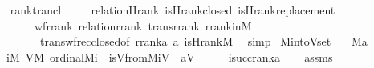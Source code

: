 \begin{isabellebody}
%
\isadelimproof
\ \ %
\endisadelimproof
%
\isatagproof
{}\isamarkupfalse%
\ rank{\isacharunderscore}{\kern0pt}trancl\ \isanewline
\ \ \isamarkupfalse%
\ relation{}{\isacharunderscore}{\kern0pt}Hrank\ is{\isacharunderscore}{\kern0pt}Hrank{\isacharunderscore}{\kern0pt}closed\ is{\isacharunderscore}{\kern0pt}Hrank{\isacharunderscore}{\kern0pt}replacement\ \isanewline
\ \ \ \ \ \ \ \ wf{\isacharunderscore}{\kern0pt}rrank\ relation{\isacharunderscore}{\kern0pt}rrank\ trans{\isacharunderscore}{\kern0pt}rrank\ rrank{\isacharunderscore}{\kern0pt}in{\isacharunderscore}{\kern0pt}M\ \isanewline
\ \ \ \ \ \ \ \ \ trans{\isacharunderscore}{\kern0pt}wfrec{\isacharunderscore}{\kern0pt}closed{\isacharbrackleft}{\kern0pt}of\ {\isachardoublequoteopen}rrank{\isacharparenleft}{\kern0pt}a{\isacharparenright}{\kern0pt}{\isachardoublequoteclose}\ a\ {\isachardoublequoteopen}is{\isacharunderscore}{\kern0pt}Hrank{\isacharparenleft}{\kern0pt}M{\isacharparenright}{\kern0pt}{\isachardoublequoteclose}{\isacharbrackright}{\kern0pt}\ \isamarkupfalse%
\ simp%
\endisatagproof
{\isafoldproof}%
%
\isadelimproof
\isanewline
%
\endisadelimproof
\isanewline
\isanewline
{}\isamarkupfalse%
\ M{\isacharunderscore}{\kern0pt}into{\isacharunderscore}{\kern0pt}Vset{\isacharcolon}{\kern0pt}\isanewline
\ \ \ {\isachardoublequoteopen}M{\isacharparenleft}{\kern0pt}a{\isacharparenright}{\kern0pt}{\isachardoublequoteclose}\isanewline
\ \ \ {\isachardoublequoteopen}{\isasymexists}i{\isacharbrackleft}{\kern0pt}M{\isacharbrackright}{\kern0pt}{\isachardot}{\kern0pt}\ {\isasymexists}V{\isacharbrackleft}{\kern0pt}M{\isacharbrackright}{\kern0pt}{\isachardot}{\kern0pt}\ ordinal{\isacharparenleft}{\kern0pt}M{\isacharcomma}{\kern0pt}i{\isacharparenright}{\kern0pt}\ {\isasymand}\ is{\isacharunderscore}{\kern0pt}Vfrom{\isacharparenleft}{\kern0pt}M{\isacharcomma}{\kern0pt}{}{\isacharcomma}{\kern0pt}i{\isacharcomma}{\kern0pt}V{\isacharparenright}{\kern0pt}\ {\isasymand}\ a{\isasymin}V{\isachardoublequoteclose}\isanewline
%
\isadelimproof
%
\endisadelimproof
%
\isatagproof
{}\isamarkupfalse%
\ {\isacharminus}{\kern0pt}\isanewline
\ \ \isamarkupfalse%
\ {\isacharquery}{\kern0pt}i{\isacharequal}{\kern0pt}{\isachardoublequoteopen}succ{\isacharparenleft}{\kern0pt}rank{\isacharparenleft}{\kern0pt}a{\isacharparenright}{\kern0pt}{\isacharparenright}{\kern0pt}{\isachardoublequoteclose}\isanewline
\ \ \isamarkupfalse%
\ assms\isanewline
\ \ \isamarkupfalse%

\end{isabellebody}
